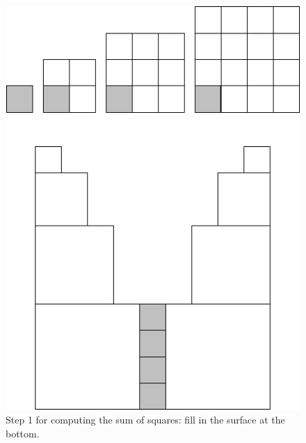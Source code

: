 \begin{figure}[ht]
\begin{center}
       \includegraphics[scale=0.4]{FiguresMaths/SumSquares2}
\caption{Step 1 for computing the sum of squares: fill in the surface at the bottom.}
       \label{fig:sumSquares2}
\end{center}
\end{figure}
